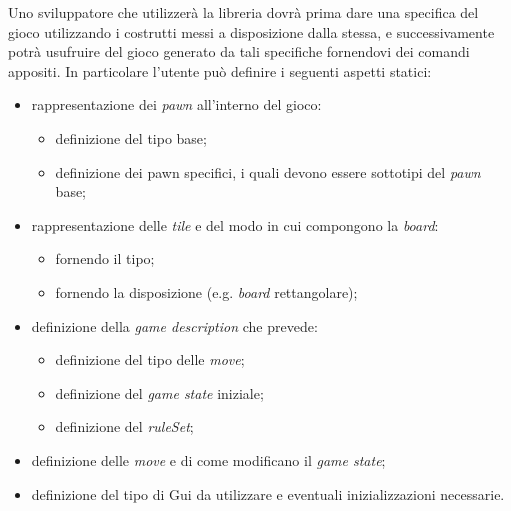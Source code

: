 Uno sviluppatore che utilizzerà la libreria dovrà prima dare una specifica del gioco utilizzando i costrutti messi a disposizione dalla stessa, e successivamente potrà usufruire del gioco generato da tali specifiche fornendovi dei comandi appositi.
%
In particolare l'utente può definire i seguenti aspetti statici:
%
\begin{itemize}
    \item rappresentazione dei \textit{pawn} all'interno del gioco:
          \begin{itemize}
              \item definizione del tipo base;
              \item definizione dei pawn specifici, i quali devono essere sottotipi del \textit{pawn} base;
          \end{itemize}
    \item rappresentazione delle \textit{tile} e del modo in cui compongono la \textit{board}:
          \begin{itemize}
              \item fornendo il tipo;
              \item fornendo la disposizione (e.g. \textit{board} rettangolare);
          \end{itemize}
    \item definizione della \textit{game description} che prevede: 
        \begin{itemize}
            \item definizione del tipo delle \textit{move};
            \item definizione del \textit{game state} iniziale;
            \item definizione del \textit{ruleSet};
        \end{itemize}
    \item definizione delle \textit{move} e di come modificano il \textit{game state};
    \item definizione del tipo di Gui da utilizzare e eventuali inizializzazioni necessarie.
\end{itemize}
%

